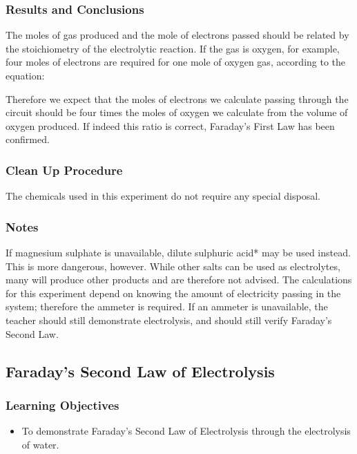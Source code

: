 \subsubsection*{Results and Conclusions}

The moles of gas produced and the mole of electrons passed should be related by the stoichiometry of the electrolytic reaction. If the gas is oxygen, for example, four moles of electrons are required for one mole of oxygen gas, according to the equation:

\begin{center}
\end{center}

Therefore we expect that the moles of electrons we calculate passing through the circuit should be four times the moles of oxygen we calculate from the volume of oxygen produced. If indeed this ratio is correct, Faraday's First Law has been confirmed.

\subsubsection*{Clean Up Procedure}
The chemicals used in this experiment do not require any special disposal.

\subsubsection*{Notes}
If magnesium sulphate is unavailable, dilute sulphuric acid* may be used instead. This is more dangerous, however. While other salts can be used as electrolytes, many will produce other products and are therefore not advised. The calculations for this experiment depend on knowing the amount of electricity passing in the system; therefore the ammeter is required. If an ammeter is unavailable, the teacher should still demonstrate electrolysis, and should still verify Faraday's Second Law.

\subsection{Faraday's Second Law of Electrolysis}

\subsubsection*{Learning Objectives}
\begin{itemize}
\item{To demonstrate Faraday's Second Law of Electrolysis through the electrolysis of water.}
\end{itemize}

